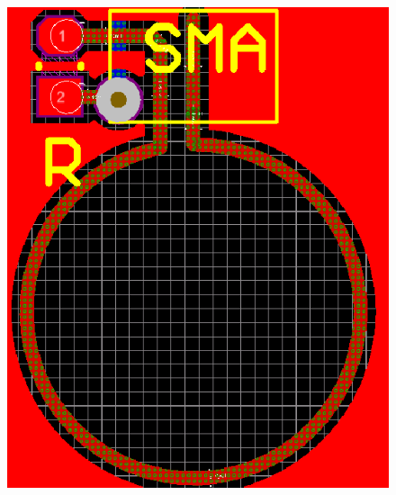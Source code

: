 \begin{figure}[htb!]
{		\includegraphics[scale=0.3]{./img/8B_layers}
		\label{fig:8B_layers}}
\end{figure}

